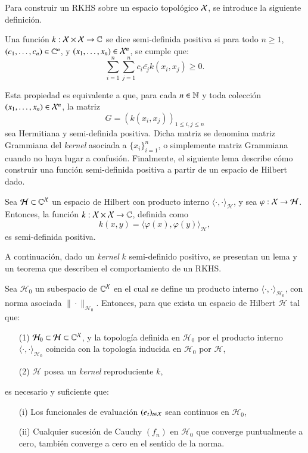 \noindent Para construir un RKHS sobre un espacio topológico \( \mathcal{X} \), se introduce la siguiente definición.

\begin{defn}  
Una función \( k: \mathcal{X} \times \mathcal{X} \to \mathbb{C} \) se dice semi-definida positiva si para todo \( n \geq 1 \), \( (c_1, \dots, c_n) \in \mathbb{C}^n \), y \( (x_1, \dots, x_n) \in \mathcal{X}^n \), se cumple que:
\[
\sum_{i=1}^n \sum_{j=1}^n c_i \bar{c_j} k(x_i, x_j) \geq 0.
\]
\end{defn}

\noindent Esta propiedad es equivalente a que, para cada \( n \in \mathbb{N} \) y toda colección \( (x_1, \dots, x_n) \in \mathcal{X}^n \), la matriz  
\[
G = \left( k(x_i, x_j) \right)_{1 \leq i, j \leq n}
\]
sea Hermitiana y semi-definida positiva. Dicha matriz se denomina matriz Grammiana del \textit{kernel} asociada a \( \{ x_i \}_{i=1}^n \), o simplemente matriz Grammiana cuando no haya lugar a confusión. Finalmente, el siguiente lema describe cómo construir una función semi-definida positiva a partir de un espacio de Hilbert dado.

\begin{lema}
Sea \( \mathcal{H} \subset \mathbb{C}^{\mathcal{X}} \) un espacio de Hilbert con producto interno \( \langle \cdot, \cdot \rangle_\mathcal{H} \), y sea \( \varphi : \mathcal{X} \to \mathcal{H} \). Entonces, la función \( k: \mathcal{X} \times \mathcal{X} \to \mathbb{C} \), definida como
\[
k(x,y) = \langle \varphi(x), \varphi(y) \rangle_\mathcal{H},
\]
es semi-definida positiva.
\end{lema}

\noindent A continuación, dado un \textit{kernel} \( k \) semi-definido positivo, se presentan un lema y un teorema que describen el comportamiento de un RKHS.

\begin{lema}
Sea \( \mathcal{H}_0 \) un subespacio de \( \mathbb{C}^{\mathcal{X}} \) en el cual se define un producto interno \( \langle \cdot, \cdot \rangle_{\mathcal{H}_0} \), con norma asociada \( \|\cdot\|_{\mathcal{H}_0} \). Entonces, para que exista un espacio de Hilbert \( \mathcal{H} \) tal que:
\begin{enumerate}
    \item[(1)] \( \mathcal{H}_0 \subset \mathcal{H} \subset \mathbb{C}^{\mathcal{X}} \), y la topología definida en \( \mathcal{H}_0 \) por el producto interno \( \langle \cdot, \cdot \rangle_{\mathcal{H}_0} \) coincida con la topología inducida en \( \mathcal{H}_0 \) por \( \mathcal{H} \),
    \item[(2)] \( \mathcal{H} \) posea un \textit{kernel} reproduciente \( k \),
\end{enumerate}
es necesario y suficiente que:
\begin{enumerate}
    \item[(i)] Los funcionales de evaluación \( (e_t)_{t \in \mathcal{X}} \) sean continuos en \( \mathcal{H}_0 \),
    \item[(ii)] Cualquier sucesión de Cauchy \( (f_n) \) en \( \mathcal{H}_0 \) que converge puntualmente a cero, también converge a cero en el sentido de la norma.
\end{enumerate}
\end{lema}

